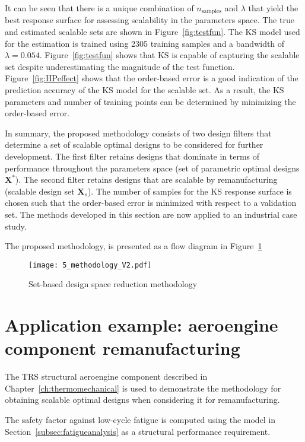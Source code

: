 It can be seen that there is a unique combination of $n_{\textrm{samples}}$ and $\lambda$ that yield the best response surface for assessing scalability in the parameters space. The true and estimated scalable sets are shown in Figure~\ref{fig:testfun}. The \ac{KS} model used for the estimation is trained using 2305 training samples and a bandwidth of $\lambda = 0.054$.
Figure~\ref{fig:testfun} shows that \ac{KS} is capable of capturing the scalable set despite underestimating the magnitude of the test function. Figure~\ref{fig:HPeffect} shows that the order-based error is a good indication of the prediction accuracy of the \ac{KS} model for the scalable set. As a result, the \ac{KS} parameters and number of training points can be determined by minimizing the order-based error.

In summary, the proposed methodology consists of two design filters that determine a set of scalable optimal designs to be considered for further development. The first filter retains designs that dominate in terms of performance throughout the parameters space (set of parametric optimal designs $\mathbf{X}^*$). The second filter retains designs that are scalable by remanufacturing (scalable design set $\mathbf{X}_s$). The number of samples for the \ac{KS} response surface is chosen such that the order-based error is minimized with respect to a validation set. The methods developed in this section are now applied to an industrial case study.

The proposed methodology, is presented as a flow diagram in Figure~\ref{fig:SBDmethods}

\begin{figure}[h]
	\centering
	\texttt{[image: 5\_methodology\_V2.pdf]}
	\caption{ \label{fig:SBDmethods} Set-based design space reduction methodology}
\end{figure}

\section{Application example: aeroengine component remanufacturing} \label{sec:SBDusecase}

The \ac{TRS} structural aeroengine component described in Chapter~\ref{ch:thermomechanical} is used to demonstrate the methodology for obtaining scalable optimal designs when considering it for remanufacturing.

The safety factor against low-cycle fatigue is computed using the model in Section~\ref{subsec:fatigueanalysis} as a structural performance requirement.

